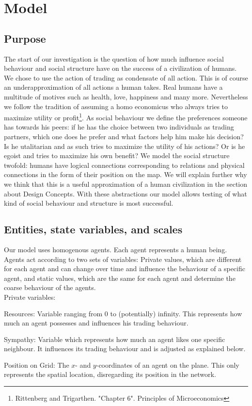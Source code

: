 \documentclass{JASSS}
\begin{document}
\section{Model}
\subsection{Purpose}
The start of our investigation is the question of how much influence social behaviour and social structure have on the success of a civilization of humans. We chose to use the action of trading as condensate of all action. This is of course an underapproximation of all actions a human takes. Real humans have a multitude of motives such as health, love, happiness and many more. Nevertheless we follow the tradition of assuming a homo economicus who always tries to maximize utility or profit\footnote{Rittenberg and Trigarthen. "Chapter 6". Principles of Microeconomics}. As social behaviour we define the preferences someone has towards his peers: if he has the choice between two individuals as trading partners, which one does he prefer and what factors help him make his decision? Is he utalitarian and as such tries to maximize the utility of his actions? Or is he egoist and tries to maximize his own benefit? We model the social structure twofold: humans have logical connections corresponding to relations and physical connections in the form of their position on the map. We will explain further why we think that this is a useful approximation of a human civilization in the section about Design Concepts. With these abstractions our model allows testing of what kind of social behaviour and structure is most successful.


\subsection{Entities, state variables, and scales}
Our model uses homogenous agents. Each agent represents a human being. Agents act according to two sets of variables: Private values, which are different for each agent and can change over time and influence the behaviour of a specific agent, and static values, which are the same for each agent and determine the coarse behaviour of the agents.\\

Private variables:
\begin{description*}
	\item[Resources:]
		Variable ranging from 0 to (potentially) infinity. This represents how much an agent possesses and influences his trading behaviour.

	\item[Sympathy:]
		Variable which represents how much an agent likes one specific neighbour. It influences its trading behaviour and is adjusted as explained below.

	\item[Position on Grid:]
		The $x$- and $y$-coordinates of an agent on the plane. This only represents the spatial location, disregarding its position in the network.
\end{description*}
\end{document}
